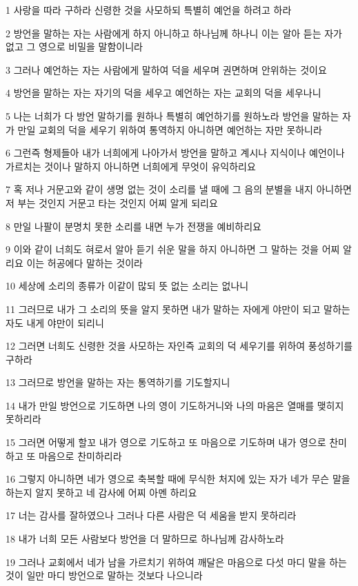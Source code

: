 \par 1 사랑을 따라 구하라 신령한 것을 사모하되 특별히 예언을 하려고 하라
\par 2 방언을 말하는 자는 사람에게 하지 아니하고 하나님께 하나니 이는 알아 듣는 자가 없고 그 영으로 비밀을 말함이니라
\par 3 그러나 예언하는 자는 사람에게 말하여 덕을 세우며 권면하며 안위하는 것이요
\par 4 방언을 말하는 자는 자기의 덕을 세우고 예언하는 자는 교회의 덕을 세우나니
\par 5 나는 너희가 다 방언 말하기를 원하나 특별히 예언하기를 원하노라 방언을 말하는 자가 만일 교회의 덕을 세우기 위하여 통역하지 아니하면 예언하는 자만 못하니라
\par 6 그런즉 형제들아 내가 너희에게 나아가서 방언을 말하고 계시나 지식이나 예언이나 가르치는 것이나 말하지 아니하면 너희에게 무엇이 유익하리요
\par 7 혹 저나 거문고와 같이 생명 없는 것이 소리를 낼 때에 그 음의 분별을 내지 아니하면 저 부는 것인지 거문고 타는 것인지 어찌 알게 되리요
\par 8 만일 나팔이 분명치 못한 소리를 내면 누가 전쟁을 예비하리요
\par 9 이와 같이 너희도 혀로서 알아 듣기 쉬운 말을 하지 아니하면 그 말하는 것을 어찌 알리요 이는 허공에다 말하는 것이라
\par 10 세상에 소리의 종류가 이같이 많되 뜻 없는 소리는 없나니
\par 11 그러므로 내가 그 소리의 뜻을 알지 못하면 내가 말하는 자에게 야만이 되고 말하는 자도 내게 야만이 되리니
\par 12 그러면 너희도 신령한 것을 사모하는 자인즉 교회의 덕 세우기를 위하여 풍성하기를 구하라
\par 13 그러므로 방언을 말하는 자는 통역하기를 기도할지니
\par 14 내가 만일 방언으로 기도하면 나의 영이 기도하거니와 나의 마음은 열매를 맺히지 못하리라
\par 15 그러면 어떻게 할꼬 내가 영으로 기도하고 또 마음으로 기도하며 내가 영으로 찬미하고 또 마음으로 찬미하리라
\par 16 그렇지 아니하면 네가 영으로 축복할 때에 무식한 처지에 있는 자가 네가 무슨 말을 하는지 알지 못하고 네 감사에 어찌 아멘 하리요
\par 17 너는 감사를 잘하였으나 그러나 다른 사람은 덕 세움을 받지 못하리라
\par 18 내가 너희 모든 사람보다 방언을 더 말하므로 하나님께 감사하노라
\par 19 그러나 교회에서 네가 남을 가르치기 위하여 깨달은 마음으로 다섯 마디 말을 하는 것이 일만 마디 방언으로 말하는 것보다 나으니라
